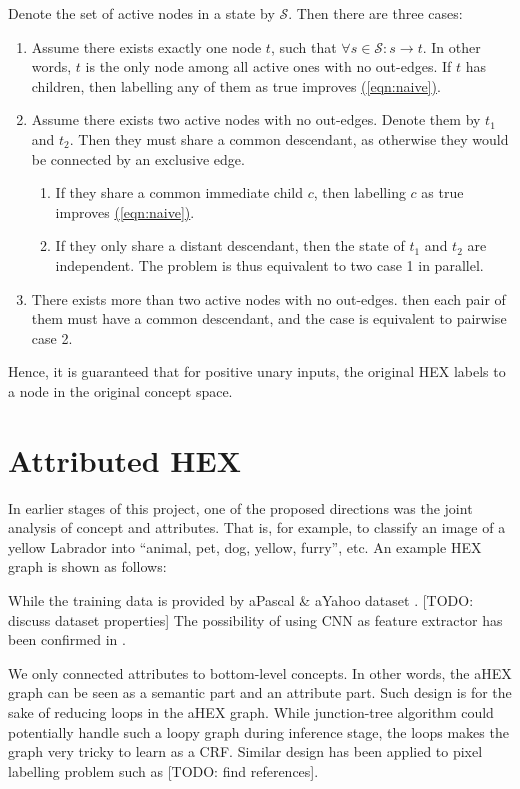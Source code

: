 \documentclass[11pt,a4paper]{article}
\begin{document}
Denote the set of active nodes in a state by $\mathcal{S}$. Then there are three cases:
\begin{enumerate}
\item Assume there exists exactly one node $t$, such that $\forall s\in\mathcal{S}:s\rightarrow t$. In other words, $t$ is the only node among all active ones with no out-edges. If $t$ has children, then labelling any of them as true improves \hyperref[eqn:naive]{(\ref{eqn:naive})}.
\item Assume there exists two active nodes with no out-edges. Denote them by $t_1$ and $t_2$. Then they must share a common descendant, as otherwise they would be connected by an exclusive edge.
\begin{enumerate}
\item If they share a common immediate child $c$, then labelling $c$ as true improves \hyperref[eqn:naive]{(\ref{eqn:naive})}.
\item If they only share a distant descendant, then the state of $t_1$ and $t_2$ are independent. The problem is thus equivalent to two case 1 in parallel.
\end{enumerate}
\item There exists more than two active nodes with no out-edges. then each pair of them must have a common descendant, and the case is equivalent to pairwise case 2.
\end{enumerate}
Hence, it is guaranteed that for positive unary inputs, the original HEX labels to a node in the original concept space.

\section{Attributed HEX}

In earlier stages of this project, one of the proposed directions was the joint analysis of concept and attributes. That is, for example, to classify an image of a yellow Labrador into ``animal, pet, dog, yellow, furry'', etc. An example HEX graph is shown as follows:

While the training data is provided by aPascal \& aYahoo dataset \cite{farhadi2009describing}. [TODO: discuss dataset properties] The possibility of using CNN as feature extractor has been confirmed in \cite{razavian2014cnn}.

We only connected attributes to bottom-level concepts. In other words, the aHEX graph can be seen as a semantic part and an attribute part. Such design is for the sake of reducing loops in the aHEX graph. While junction-tree algorithm could potentially handle such a loopy graph during inference stage, the loops makes the graph very tricky to learn as a CRF. Similar design has been applied to pixel labelling problem such as [TODO: find references].
\end{document}
